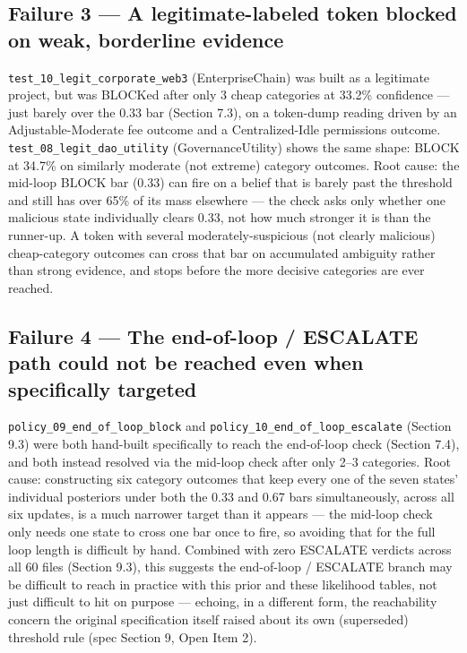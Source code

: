 \documentclass[11pt]{article}
\begin{document}
\subsection{Failure 3 --- A legitimate-labeled token blocked on weak, borderline evidence}

\texttt{test\_10\_legit\_corporate\_web3} (EnterpriseChain) was built as a legitimate project, but was BLOCKed after only 3 cheap categories at 33.2\% confidence --- just barely over the 0.33 bar (Section 7.3), on a token-dump reading driven by an Adjustable-Moderate fee outcome and a Centralized-Idle permissions outcome. \texttt{test\_08\_legit\_dao\_utility} (GovernanceUtility) shows the same shape: BLOCK at 34.7\% on similarly moderate (not extreme) category outcomes. Root cause: the mid-loop BLOCK bar (0.33) can fire on a belief that is barely past the threshold and still has over 65\% of its mass elsewhere --- the check asks only whether one malicious state individually clears 0.33, not how much stronger it is than the runner-up. A token with several moderately-suspicious (not clearly malicious) cheap-category outcomes can cross that bar on accumulated ambiguity rather than strong evidence, and stops before the more decisive categories are ever reached.

\subsection{Failure 4 --- The end-of-loop / ESCALATE path could not be reached even when specifically targeted}

\texttt{policy\_09\_end\_of\_loop\_block} and \texttt{policy\_10\_end\_of\_loop\_escalate} (Section 9.3) were both hand-built specifically to reach the end-of-loop check (Section 7.4), and both instead resolved via the mid-loop check after only 2--3 categories. Root cause: constructing six category outcomes that keep every one of the seven states' individual posteriors under both the 0.33 and 0.67 bars simultaneously, across all six updates, is a much narrower target than it appears --- the mid-loop check only needs one state to cross one bar once to fire, so avoiding that for the full loop length is difficult by hand. Combined with zero ESCALATE verdicts across all 60 files (Section 9.3), this suggests the end-of-loop / ESCALATE branch may be difficult to reach in practice with this prior and these likelihood tables, not just difficult to hit on purpose --- echoing, in a different form, the reachability concern the original specification itself raised about its own (superseded) threshold rule (spec Section 9, Open Item 2).
\end{document}
